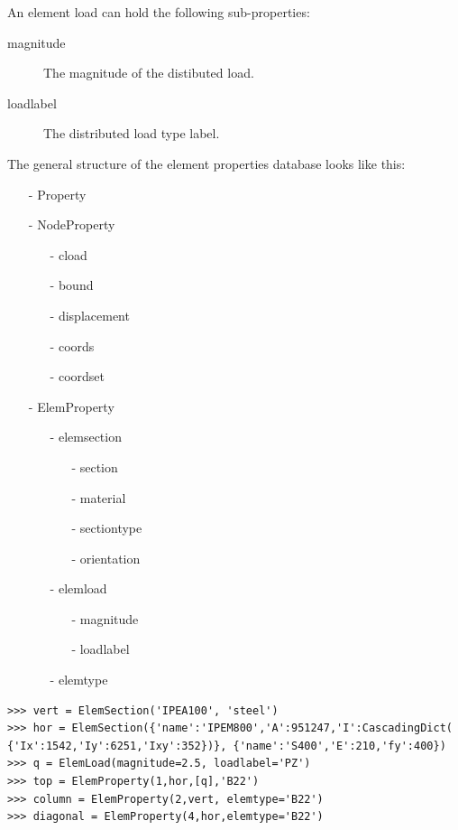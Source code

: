 {An element load can hold the following sub-properties:
\begin{description}
\item [magnitude] The magnitude of the distibuted load.
\item [loadlabel] The distributed load type label.
\end{description}

The general structure of the element properties database looks like this:
\begin{itemize}
\item[-] Property
\item[-] NodeProperty
    \begin{itemize}
    \item[-] cload
    \item[-] bound
    \item[-] displacement
    \item[-] coords
    \item[-] coordset
    \end{itemize}
\item[-] ElemProperty 
    \begin{itemize}
    \item[-] elemsection
        \begin{itemize}
        \item[-] section
        \item[-] material
        \item[-] sectiontype
        \item[-] orientation
        \end{itemize}
    \item[-] elemload
        \begin{itemize}
        \item[-] magnitude
        \item[-] loadlabel
        \end{itemize}
    \item[-] elemtype
    \end{itemize}
\end{itemize}

\begin{verbatim}
>>> vert = ElemSection('IPEA100', 'steel')
>>> hor = ElemSection({'name':'IPEM800','A':951247,'I':CascadingDict(
{'Ix':1542,'Iy':6251,'Ixy':352})}, {'name':'S400','E':210,'fy':400})
>>> q = ElemLoad(magnitude=2.5, loadlabel='PZ')
>>> top = ElemProperty(1,hor,[q],'B22')
>>> column = ElemProperty(2,vert, elemtype='B22')
>>> diagonal = ElemProperty(4,hor,elemtype='B22')


\end{verbatim}}
